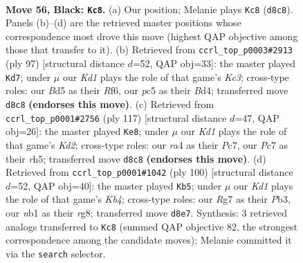 \documentclass[11pt]{article}
\begin{document}
\clearpage

\begin{figure}[p]\centering
\begin{subfigure}{0.46\textwidth}\centering
\resizebox{\linewidth}{!}{%
\newchessgame
\chessboard[
  setfen={1r1k4/p1p3r1/P1p3p1/2Pb1p1p/RP3P1P/7R/5K2/1N6 b - - 35 56},
  showmover=false,
  pgfstyle=straightmove, color=movearrow, markmove={d8-c8}
]}
\caption{}
\end{subfigure}\hfill
\begin{subfigure}{0.46\textwidth}\centering
\resizebox{\linewidth}{!}{%
\newchessgame
\chessboard[
  setfen={4r3/2p5/p1k2rp1/P1p1p2p/2Pb3P/1P3PPN/4R1K1/1R6 b - - 30 49},
  showmover=false,
  pgfstyle=straightmove, color=movearrow, markmove={c6-d7}
]}
\caption{}
\end{subfigure}
\\[4pt]
\begin{subfigure}{0.46\textwidth}\centering
\resizebox{\linewidth}{!}{%
\newchessgame
\chessboard[
  setfen={8/2pk1r2/1p1p4/pP5R/P1PPr1p1/6P1/5P2/3R1K2 b - - 0 59},
  showmover=false,
  pgfstyle=straightmove, color=movearrow, markmove={d7-e8}
]}
\caption{}
\end{subfigure}\hfill
\begin{subfigure}{0.46\textwidth}\centering
\resizebox{\linewidth}{!}{%
\newchessgame
\chessboard[
  setfen={6r1/r2pk3/1p2p1p1/4P2p/PK1R1P1P/1P4R1/8/8 w - - 1 51},
  showmover=false,
  pgfstyle=straightmove, color=movearrow, markmove={b4-b5}
]}
\caption{}
\end{subfigure}
\caption{\textbf{Move 56, Black: \texttt{Kc8}.} (a) Our position; Melanie plays \texttt{Kc8} (\texttt{d8c8}). Panels (b)--(d) are the retrieved master positions whose correspondence most drove this move (highest QAP objective among those that transfer to it). (b) Retrieved from \texttt{ccrl\_top\_p0003\#2913} (ply 97) [structural distance $d$=52, QAP obj=33]: the master played \texttt{Kd7}; under $\mu$ our \emph{Kd1} plays the role of that game's \emph{Kc3}; cross-type roles: our \emph{B}d5 as their \emph{R}f6, our \emph{p}c5 as their \emph{B}d4; transferred move \texttt{d8c8} \textbf{(endorses this move)}. (c) Retrieved from \texttt{ccrl\_top\_p0001\#2756} (ply 117) [structural distance $d$=47, QAP obj=26]: the master played \texttt{Ke8}; under $\mu$ our \emph{Kd1} plays the role of that game's \emph{Kd2}; cross-type roles: our \emph{r}a4 as their \emph{P}c7, our \emph{P}c7 as their \emph{r}h5; transferred move \texttt{d8c8} \textbf{(endorses this move)}. (d) Retrieved from \texttt{ccrl\_top\_p0001\#1042} (ply 100) [structural distance $d$=52, QAP obj=40]: the master played \texttt{Kb5}; under $\mu$ our \emph{Kd1} plays the role of that game's \emph{Kb4}; cross-type roles: our \emph{R}g7 as their \emph{P}b3, our \emph{n}b1 as their \emph{r}g8; transferred move \texttt{d8e7}. Synthesis: 3 retrieved analogs transferred to \texttt{Kc8} (summed QAP objective 82, the strongest correspondence among the candidate moves); Melanie committed it via the \texttt{search} selector.}
\label{fig:thought-m111}
\end{figure}
\end{document}
